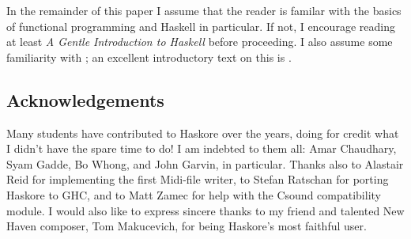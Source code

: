 In the remainder of this paper I assume that the reader is familar
with the basics of functional programming and Haskell in particular.
If not, I encourage reading at least {\em A Gentle Introduction to
Haskell} \cite{haskell-tutorial} before proceeding.  I also assume
some familiarity with ; an excellent
introductory text on this is \cite{birdwadler88}.


\subsection{Acknowledgements}

Many students have contributed to Haskore over the years, doing for
credit what I didn't have the spare time to do!  I am indebted to them
all: Amar Chaudhary, Syam Gadde, Bo Whong, and John Garvin, in
particular.  Thanks also to Alastair Reid for implementing the first
Midi-file writer, to Stefan Ratschan for porting Haskore to GHC, and
to Matt Zamec for help with the Csound compatibility module.  I would
also like to express sincere thanks to my friend and talented New
Haven composer, Tom Makucevich, for being Haskore's most faithful
user.

